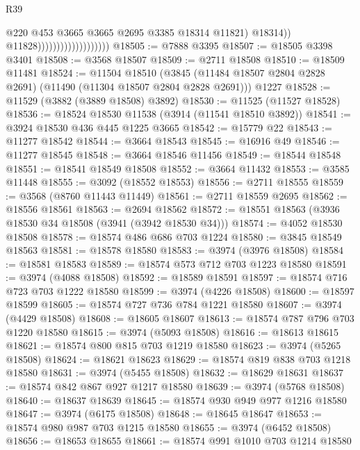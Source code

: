 \begin{lexlean}{R39}
\begin{coremodule}
                                                @220
                                                @453
                                                @3665
                                                @3665
                                                @2695
                                                @3385
                                                @18314
                                                @11821)
                                              @18314))
                                          @11828)))))))))))))))))))
@18505 := @7888 @3395
@18507 := @18505 @3398 @3401
@18508 := @3568 @18507
@18509 := @2711 @18508
@18510 := @18509 @11481
@18524 := @11504
    @18510
    (@3845 (@11484 @18507 @2804 @2828 @2691) (@11490 (@11304 @18507 @2804 @2828 @2691)))
    @1227
@18528 := @11529 (@3882 (@3889 @18508) @3892)
@18530 := @11525 (@11527 @18528)
@18536 := @18524 @18530 @11538 (@3914 (@11541 @18510 @3892))
@18541 := @3924 @18530 @436 @445 @1225 @3665
@18542 := @15779 @22
@18543 := @11277 @18542
@18544 := @3664 @18543
@18545 := @16916 @49
@18546 := @11277 @18545
@18548 := @3664 @18546 @11456
@18549 := @18544 @18548
@18551 := @18541 @18549 @18508
@18552 := @3664 @11432
@18553 := @3585 @11448
@18555 := @3092 (@18552 @18553)
@18556 := @2711 @18555
@18559 := @3568 (@8760 @11443 @11449)
@18561 := @2711 @18559 @2695
@18562 := @18556 @18561
@18563 := @2694 @18562
@18572 := @18551 @18563 (@3936 @18530 @34 @18508 (@3941 (@3942 @18530 @34)))
@18574 := @4052 @18530 @18508
@18578 := @18574 @486 @686 @703 @1224
@18580 := @3845 @18549 @18563
@18581 := @18578 @18580
@18583 := @3974 (@3976 @18508)
@18584 := @18581 @18583
@18589 := @18574 @573 @712 @703 @1223 @18580
@18591 := @3974 (@4088 @18508)
@18592 := @18589 @18591
@18597 := @18574 @716 @723 @703 @1222 @18580
@18599 := @3974 (@4226 @18508)
@18600 := @18597 @18599
@18605 := @18574 @727 @736 @784 @1221 @18580
@18607 := @3974 (@4429 @18508)
@18608 := @18605 @18607
@18613 := @18574 @787 @796 @703 @1220 @18580
@18615 := @3974 (@5093 @18508)
@18616 := @18613 @18615
@18621 := @18574 @800 @815 @703 @1219 @18580
@18623 := @3974 (@5265 @18508)
@18624 := @18621 @18623
@18629 := @18574 @819 @838 @703 @1218 @18580
@18631 := @3974 (@5455 @18508)
@18632 := @18629 @18631
@18637 := @18574 @842 @867 @927 @1217 @18580
@18639 := @3974 (@5768 @18508)
@18640 := @18637 @18639
@18645 := @18574 @930 @949 @977 @1216 @18580
@18647 := @3974 (@6175 @18508)
@18648 := @18645 @18647
@18653 := @18574 @980 @987 @703 @1215 @18580
@18655 := @3974 (@6452 @18508)
@18656 := @18653 @18655
@18661 := @18574 @991 @1010 @703 @1214 @18580

\end{coremodule}
\end{lexlean}
